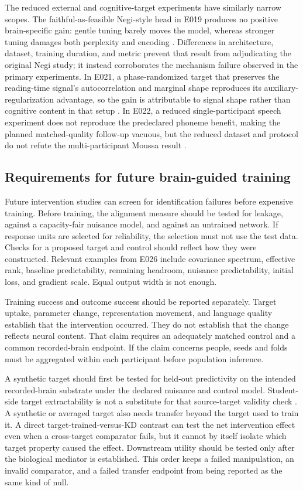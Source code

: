 The reduced external and cognitive-target experiments have similarly narrow scopes.
The faithful-as-feasible Negi-style head in E019 produces no positive brain-specific gain: gentle tuning barely moves the model, whereas stronger tuning damages both perplexity and encoding .
Differences in architecture, dataset, training duration, and metric prevent that result from adjudicating the original Negi study; it instead corroborates the mechanism failure observed in the primary experiments.
In E021, a phase-randomized target that preserves the reading-time signal's autocorrelation and marginal shape reproduces its auxiliary-regularization advantage, so the gain is attributable to signal shape rather than cognitive content in that setup .
In E022, a reduced single-participant speech experiment does not reproduce the predeclared phoneme benefit, making the planned matched-quality follow-up vacuous, but the reduced dataset and protocol do not refute the multi-participant Moussa result .

\subsection{Requirements for future brain-guided training}

Future intervention studies can screen for identification failures before expensive training.
Before training, the alignment measure should be tested for leakage, against a capacity-fair nuisance model, and against an untrained network.
If response units are selected for reliability, the selection must not use the test data.
Checks for a proposed target and control should reflect how they were constructed.
Relevant examples from E026 include covariance spectrum, effective rank, baseline predictability, remaining headroom, nuisance predictability, initial loss, and gradient scale.
Equal output width is not enough.

Training success and outcome success should be reported separately.
Target uptake, parameter change, representation movement, and language quality establish that the intervention occurred.
They do not establish that the change reflects neural content.
That claim requires an adequately matched control and a common recorded-brain endpoint.
If the claim concerns people, seeds and folds must be aggregated within each participant before population inference.

A synthetic target should first be tested for held-out predictivity on the intended recorded-brain substrate under the declared nuisance and control model.
Student-side target extractability is not a substitute for that source-target validity check .
A synthetic or averaged target also needs transfer beyond the target used to train it.
A direct target-trained-versus-KD contrast can test the net intervention effect even when a cross-target comparator fails, but it cannot by itself isolate which target property caused the effect.
Downstream utility should be tested only after the biological mediator is established.
This order keeps a failed manipulation, an invalid comparator, and a failed transfer endpoint from being reported as the same kind of null.


